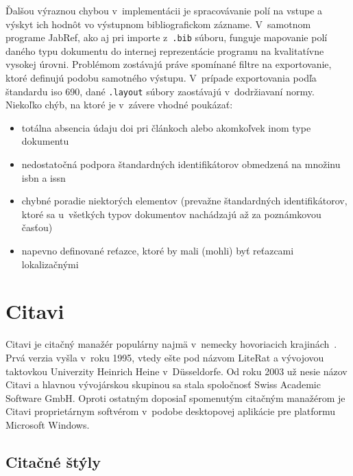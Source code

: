 \documentclass[
  color,
  table,
  nolof,
  oneside,
]{fithesis3}
\begin{document}


Ďalšou výraznou chybou v~implementácii je spracovávanie polí na vstupe a výskyt ich hodnôt vo výstupnom bibliografickom zázname. V~samotnom programe JabRef, ako aj pri importe z~\texttt{.bib} súboru, funguje mapovanie polí daného typu dokumentu do internej reprezentácie programu na kvalitatívne vysokej úrovni. Problémom zostávajú práve spomínané filtre na exportovanie, ktoré definujú podobu samotného výstupu. V~prípade exportovania podľa štandardu \gls{iso} 690, dané \texttt{.layout} súbory zaostávajú v~dodržiavaní normy. Niekoľko chýb, na ktoré je v~závere vhodné poukázať:

\begin{itemize}
\item totálna absencia údaju \gls{doi} pri článkoch alebo akomkoľvek inom type dokumentu
\item nedostatočná podpora štandardných identifikátorov obmedzená na množinu \gls{isbn} a \gls{issn}
\item chybné poradie niektorých elementov (prevažne štandardných identifikátorov, ktoré sa u~všetkých typov dokumentov nachádzajú až za poznámkovou časťou)
\item napevno definované reťazce, ktoré by mali (mohli) byť reťazcami lokalizačnými
\end{itemize}

\section{Citavi}

Citavi je citačný manažér populárny najmä v~nemecky hovoriacich krajinách~\cite{Stohr2010}. Prvá verzia vyšla v~roku 1995, vtedy ešte pod názvom LiteRat a vývojovou taktovkou Univerzity Heinrich Heine v~Düsseldorfe. Od roku 2003 už nesie názov Citavi a hlavnou vývojárskou skupinou sa stala spoločnosť Swiss Academic Software GmbH. Oproti ostatným doposiaľ spomenutým citačným manažérom je Citavi proprietárnym softvérom v~podobe desktopovej aplikácie pre platformu Microsoft Windows.

\subsection{Citačné štýly}
\end{document}
